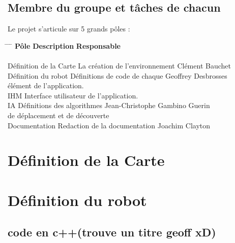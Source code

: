 \documentclass[a4paper 12pts]{article}
\begin{document}
\subsection{Membre du groupe et tâches de chacun}
\vspace{1 cm}

Le projet s'articule sur 5 grands pôles :

\vspace{1 cm}

\begin{tabbing}
\hspace{3.75 cm} \= \hspace{6 cm} \= \hspace{3.75 cm} \= \kill
\textbf{Pôle}\> \textbf{Description} \> \textbf {Responsable} \\
\\
Définition de la Carte \> La création de l'environnement \> Clément Bauchet\\											
Définition du robot \> Définitions de code de chaque \> Geoffrey Desbrosses\+ \\
élément de l'application. \- \\
IHM \> Interface utilisateur de l'application.\\
IA  \> Définitions des algorithmes \> Jean-Christophe Gambino Guerin \+ \\	
de déplacement et de découverte \-	\\
Documentation  \> Redaction de la documentation \> Joachim Clayton                           
\end{tabbing}





\newpage
\section{Définition de la Carte}





\newpage
\section{Définition du robot}


\subsection{code en c++(trouve un titre geoff xD)}
\end{document}
